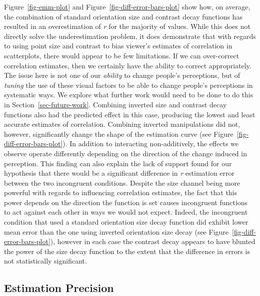 \documentclass[manuscript, review, anonymous, screen]{acmart}
\begin{document}
Figure~\ref{fig-emm-plot} and Figure~\ref{fig-diff-error-bars-plot} show
how, on average, the combination of standard orientation size and
contrast decay functions has resulted in an overestimation of \emph{r}
for the majority of values. While this does not directly solve the
underestimation problem, it does demonstrate that with regards to using
point size and contrast to bias viewer's estimates of correlation in
scatterplots, there would appear to be few limitations. If we can
over-correct correlation estimates, then we certainly have the ability
to correct appropriately. The issue here is not one of our
\emph{ability} to change people's perceptions, but of \emph{tuning} the
use of these visual factors to be able to change people's perceptions in
systematic ways. We explore what further work would need to be done to
do this in Section~\ref{sec-future-work}. Combining inverted size and
contrast decay functions also had the predicted effect in this case,
producing the lowest and least accurate estimates of correlation.
Combining inverted manipulations did not, however, significantly change
the shape of the estimation curve (see
Figure~\ref{fig-diff-error-bars-plot}). In addition to interacting
non-additively, the effects we observe operate differently depending on
the direction of the change induced in perception. This finding can also
explain the lack of support found for our hypothesis that there would be
a significant difference in \emph{r} estimation error between the two
incongruent conditions. Despite the size channel being more powerful
with regards to influencing correlation estimates, the fact that this
power depends on the direction the function is set causes incongruent
functions to act against each other in ways we would not expect. Indeed,
the incongruent condition that used a standard orientation size decay
function did exhibit lower mean error than the one using inverted orientation size
decay (see Figure~\ref{fig-diff-error-bars-plot}), however in each case
the contrast decay appears to have blunted the power of the size decay
function to the extent that the difference in errors is not
statistically significant.

\hypertarget{estimation-precision}{%
\subsection{Estimation Precision}\label{estimation-precision}}
\end{document}
